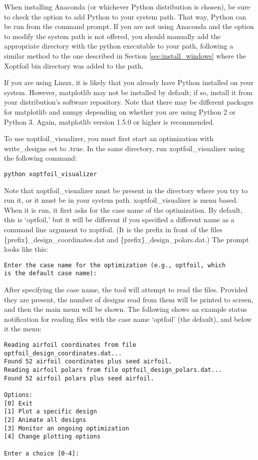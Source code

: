\documentclass[11pt]{article}
\begin{document}
When installing Anaconda (or whichever Python distribution is chosen), be sure to check
the option to add Python to your system path.  That way, Python can be run from the
command prompt.  If you are not using Anaconda and the option to modify the system path is
not offered, you should manually add the appropriate directory with the python executable
to your path, following a similar method to the one described in Section
\ref{sec:install_windows} where the Xoptfoil bin directory was added to the path.

If you are using Linux, it is likely that you already have Python installed on your
system.  However, matplotlib may not be installed by default; if so, install it from your
distribution's software repository.  Note that there may be different packages for 
matplotlib
and numpy depending on whether you are using Python 2 or Python 3. Again, matplotlib
version 1.5.0 or higher is recommended.

To use xoptfoil\_visualizer, you must first start an optimization with write\_designs set
to .true. In the same directory, run xoptfoil\_visualizer using the following command:

\begin{verbatim}
python xoptfoil_visualizer
\end{verbatim}

Note that xoptfoil\_visualizer must be present in the directory where you try to run it,
or it must be in your system path.  xoptfoil\_visualizer is menu based.  When it is run, 
it first asks for the case name of the optimization.  By default, this is `optfoil,' but
it will be different if you specified a different name as a command line argument to
xoptfoil. (It is the prefix in front of the files 
\{prefix\}\_design\_coordinates.dat and
\{prefix\}\_design\_polars.dat.)  The prompt looks like this:

\begin{verbatim}
Enter the case name for the optimization (e.g., optfoil, which 
is the default case name): 
\end{verbatim}

After specifying the case name, the tool will attempt to read the files.  Provided they
are present, the number of designs read from them will be printed to screen, and then the
main menu will be shown.  The following shows an example status notification for reading
files with the case name `optfoil' (the default), and below it the menu:

\begin{verbatim}
Reading airfoil coordinates from file optfoil_design_coordinates.dat...
Found 52 airfoil coordinates plus seed airfoil.
Reading airfoil polars from file optfoil_design_polars.dat...
Found 52 airfoil polars plus seed airfoil.

Options:
[0] Exit
[1] Plot a specific design
[2] Animate all designs 
[3] Monitor an ongoing optimization
[4] Change plotting options

Enter a choice [0-4]: 
\end{verbatim}
\end{document}
